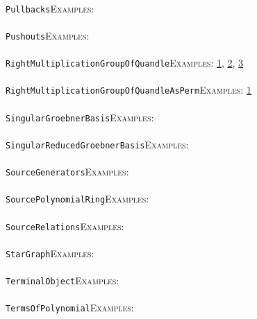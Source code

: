 \documentclass[a4paper,11pt]{report}
\begin{document}
{{ \\
 \texttt{Pullbacks}{\nobreakspace}{\nobreakspace}{\nobreakspace}{\nobreakspace}\textsc{Examples:} \\
 \\
 \texttt{Pushouts}{\nobreakspace}{\nobreakspace}{\nobreakspace}{\nobreakspace}\textsc{Examples:} \\
 \\
 \texttt{RightMultiplicationGroupOfQuandle}{\nobreakspace}{\nobreakspace}{\nobreakspace}{\nobreakspace}\textsc{Examples:} \href{../www/SideLinks/About/aboutQuandles2.html} {1}{\nobreakspace}, \href{../www/SideLinks/About/aboutQuandles.html} {2}{\nobreakspace}, \href{../www/SideLinks/About/aboutKnotsQuandles.html} {3}{\nobreakspace} \\
 \\
 \texttt{RightMultiplicationGroupOfQuandleAsPerm}{\nobreakspace}{\nobreakspace}{\nobreakspace}{\nobreakspace}\textsc{Examples:} \href{../www/SideLinks/About/aboutQuandles.html} {1}{\nobreakspace} \\
 \\
 \texttt{SingularGroebnerBasis}{\nobreakspace}{\nobreakspace}{\nobreakspace}{\nobreakspace}\textsc{Examples:} \\
 \\
 \texttt{SingularReducedGroebnerBasis}{\nobreakspace}{\nobreakspace}{\nobreakspace}{\nobreakspace}\textsc{Examples:} \\
 \\
 \texttt{SourceGenerators}{\nobreakspace}{\nobreakspace}{\nobreakspace}{\nobreakspace}\textsc{Examples:} \\
 \\
 \texttt{SourcePolynomialRing}{\nobreakspace}{\nobreakspace}{\nobreakspace}{\nobreakspace}\textsc{Examples:} \\
 \\
 \texttt{SourceRelations}{\nobreakspace}{\nobreakspace}{\nobreakspace}{\nobreakspace}\textsc{Examples:} \\
 \\
 \texttt{StarGraph}{\nobreakspace}{\nobreakspace}{\nobreakspace}{\nobreakspace}\textsc{Examples:} \\
 \\
 \texttt{TerminalObject}{\nobreakspace}{\nobreakspace}{\nobreakspace}{\nobreakspace}\textsc{Examples:} \\
 \\
 \texttt{TermsOfPolynomial}{\nobreakspace}{\nobreakspace}{\nobreakspace}{\nobreakspace}\textsc{Examples:} \\
}}
\end{document}
